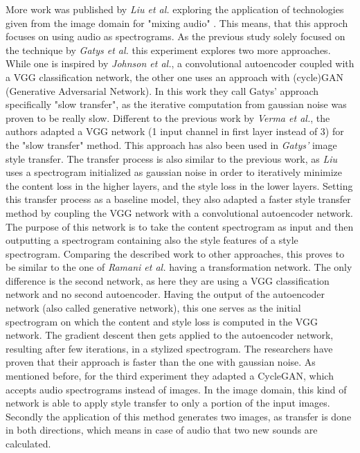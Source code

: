 More work was published by \textit{Liu et al.} exploring the application of technologies given from the image domain for "mixing audio" \cite{Liu2019}. This means, that this approch focuses on using audio as spectrograms. As the previous study solely focused on the technique by \textit{Gatys et al.} this experiment explores two more approaches. While one is inspired by \textit{Johnson et al.}, a convolutional autoencoder coupled with a VGG classification network, the other one uses an approach with (cycle)GAN (Generative Adversarial Network). In this work they call Gatys' approach specifically "slow transfer", as the iterative computation from gaussian noise was proven to be really slow. Different to the previous work by \textit{Verma et al.}, the authors adapted a VGG network (1 input channel in first layer instead of 3) for the "slow transfer" method. This approach has also been used in \textit{Gatys'} image style transfer. The transfer process is also similar to the previous work, as \textit{Liu} uses a spectrogram initialized as gaussian noise in order to iteratively minimize the content loss in the higher layers, and the style loss in the lower layers. Setting this transfer process as a baseline model, they also adapted a faster style transfer method by coupling the VGG network with a convolutional autoencoder network. The purpose of this network is to take the content spectrogram as input and then outputting a spectrogram containing also the style features of a style spectrogram. Comparing the described work to other approaches, this proves to be similar to the one of \textit{Ramani et al.} having a transformation network. The only difference is the second network, as here they are using a VGG classification network and no second autoencoder. Having the output of the autoencoder network (also called generative network), this one serves as the initial spectrogram on which the content and style loss is computed in the VGG network. The gradient descent then gets applied to the autoencoder network, resulting after few iterations, in a stylized spectrogram. The researchers have proven that their approach is faster than the one with gaussian noise. As mentioned before, for the third experiment they adapted a CycleGAN, which accepts audio spectrograms instead of images. In the image domain, this kind of network is able to apply style transfer to only a portion of the input images. Secondly the application of this method generates two images, as transfer is done in both directions, which means in case of audio that two new sounds are calculated.\\

